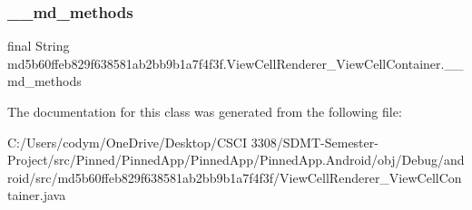 \subsubsection{\texorpdfstring{\+\_\+\+\_\+md\+\_\+methods}{\_\_md\_methods}}
{\footnotesize\ttfamily final String md5b60ffeb829f638581ab2bb9b1a7f4f3f.\+View\+Cell\+Renderer\+\_\+\+View\+Cell\+Container.\+\_\+\+\_\+md\+\_\+methods\hspace{0.3cm}{\ttfamily [static]}}



The documentation for this class was generated from the following file\+:\begin{DoxyCompactItemize}
\item 
C\+:/\+Users/codym/\+One\+Drive/\+Desktop/\+C\+S\+C\+I 3308/\+S\+D\+M\+T-\/\+Semester-\/\+Project/src/\+Pinned/\+Pinned\+App/\+Pinned\+App/\+Pinned\+App.\+Android/obj/\+Debug/android/src/md5b60ffeb829f638581ab2bb9b1a7f4f3f/View\+Cell\+Renderer\+\_\+\+View\+Cell\+Container.\+java\end{DoxyCompactItemize}
